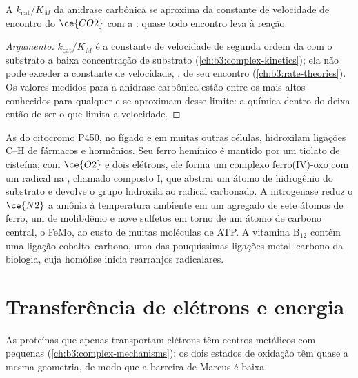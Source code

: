 \begin{proposition}\label{prop:b3:bioinorganic:carbonic-anhydrase}
A  $k_{\mathrm{cat}}/K_M$ da anidrase carbônica se aproxima da constante
de velocidade de encontro do $\ce{CO2}$ com a : quase todo encontro leva à
reação.
\end{proposition}

\begin{proof}[Argumento]
$k_{\mathrm{cat}}/K_M$ é a constante de velocidade de segunda ordem da  com o substrato a baixa
concentração de substrato (\cref{ch:b3:complex-kinetics}); ela não pode exceder a
constante de velocidade, , de seu encontro
(\cref{ch:b3:rate-theories}). Os valores medidos para a anidrase carbônica estão
entre os mais altos conhecidos para qualquer  e se aproximam desse limite: a química
dentro do  deixa então de ser o que limita a velocidade.
\end{proof}

As  do citocromo P450, no fígado e em muitas outras células, hidroxilam ligações C--H
de fármacos e hormônios. Seu ferro hemínico é mantido por um tiolato de cisteína; com
$\ce{O2}$ e dois elétrons, ele forma um complexo ferro(IV)-oxo com um radical na
, chamado composto I, que abstrai um átomo de hidrogênio do
substrato e devolve o grupo hidroxila ao radical carbonado. A nitrogenase
reduz o $\ce{N2}$ a amônia à temperatura ambiente em um agregado de sete átomos de ferro,
um de molibdênio e nove sulfetos em torno de um átomo de carbono central, o 
FeMo, ao custo de muitas moléculas de ATP. A vitamina $\mathrm{B_{12}}$ contém uma
ligação cobalto--carbono, uma das pouquíssimas ligações metal--carbono da biologia, cuja
homólise inicia rearranjos radicalares.

\section{Transferência de elétrons e energia}

As proteínas que apenas transportam elétrons têm centros metálicos com pequenas
 (\cref{ch:b3:complex-mechanisms}): os dois estados de
oxidação têm quase a mesma geometria, de modo que a barreira de Marcus é baixa.

